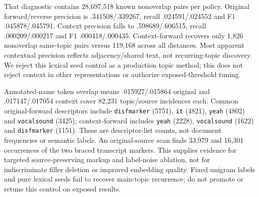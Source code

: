 \documentclass[11pt]{article}
\begin{document}
That diagnostic contains 28,697,518 known nonoverlap pairs per policy.
Original forward/reverse precision is .341508/.339267, recall
.024591/.024552 and F1 .045878/.045791. Context precision falls to
.598689/.606515, recall .000209/.000217 and F1 .000418/.000435. Context-forward
recovers only 1,826 nonoverlap same-topic pairs versus 119,168 across all
distances. Most apparent contextual precision reflects adjacency/shared text,
not recurring-topic discovery. We reject this lexical seed control as a
production topic method; this does not reject context in other representations
or authorize exposed-threshold tuning.

Annotated-name token overlap means .015927/.015864 original and
.017147/.017054 context cover 82,231 topic/source incidences each. Common
original-forward descriptors include \texttt{disfmarker} (5751),
\texttt{it} (4821), \texttt{yeah} (4802) and \texttt{vocalsound} (3425); context-forward
includes \texttt{yeah} (2228), \texttt{vocalsound} (1622) and \texttt{disfmarker} (1151).
These are descriptor-list counts, not document frequencies or semantic labels.
An original-source scan finds 33,979 and 16,301 occurrences of the two braced
transcript markers. This supplies evidence for targeted source-preserving markup
and label-noise ablation, not for indiscriminate filler deletion or improved
embedding quality. Fixed unigram labels and pure lexical seeds fail to recover
main-topic recurrence; do not promote or retune this control on exposed results.
\end{document}
